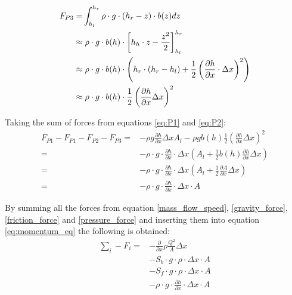 \begin{equation}
\begin{aligned}
	F_{P3}=& \int_{h_l}^{h_r} \rho \cdot g \cdot (h_r - z)\cdot b(z)dz \vspace{2mm} \\
		  \approx& \hspace{1mm} \rho \cdot g \cdot b(h) \cdot \left[ h_h \cdot z - \frac{z^2}{2}  \right]_{h_l}^{h_r} \\
		  \approx& \hspace{1mm} \rho \cdot g \cdot b(h) \cdot \left( h_r\cdot (h_r -h_l) + \frac{1}{2} \left( \frac{\partial h}{\partial x} \cdot \Delta x\right)^2 \right) \\
	\approx& \hspace{1mm} \rho \cdot g \cdot b(h) \cdot \frac{1}{2}\left(\frac{\partial h}{\partial x}\Delta x\right)^2
\end{aligned}	
\end{equation}	

Taking the sum of forces from equations \ref{eq:P1} and \ref{eq:P2}:
\begin{equation}
\begin{aligned}
F_{P1} -F_{P1} -F_{P2} - F_{P3} =& 
	 -\rho g \frac{\partial h}{\partial x}\Delta x A_l 
	 -\rho g b(h) \frac{1}{2}\left(\frac{\partial h}{\partial x}\Delta x\right)^2 \\
=& -\rho\cdot g \cdot \frac{\partial h}{\partial x} \cdot \Delta x \left(A_l + \frac{1}{2}b(h)\frac{\partial h}{\partial x} \Delta x \right) \\
=& -\rho\cdot g \cdot \frac{\partial h}{\partial x} \cdot \Delta x \left(A_l + \frac{1}{2}\frac{\partial A}{\partial x} \Delta x \right) \\
=&-\rho\cdot g \cdot \frac{\partial h}{\partial x} \cdot \Delta x  \cdot A  
\label{pressure_force}
\end{aligned}
\end{equation}

By summing all the forces from equation \ref{mass_flow_speed}, \ref{gravity_force}, \ref{friction_force} and \ref{pressure_force} and inserting them into equation \ref{eq:momentum_eq} the following is obtained:
\begin{equation}
\begin{aligned}
\sum_{i} -F_i	=&- \frac{\partial}{\partial x} \rho \frac{Q^2}{A}\Delta x \\
&-S_b \cdot g \cdot \rho \cdot \Delta x \cdot A \\
&-S_f \cdot g \cdot \rho \cdot \Delta x \cdot A \\ 
&-\rho\cdot g \cdot \frac{\partial h}{\partial x} \cdot \Delta x \cdot A
\end{aligned}
\label{eq:sum_of_forces}
\end{equation}

